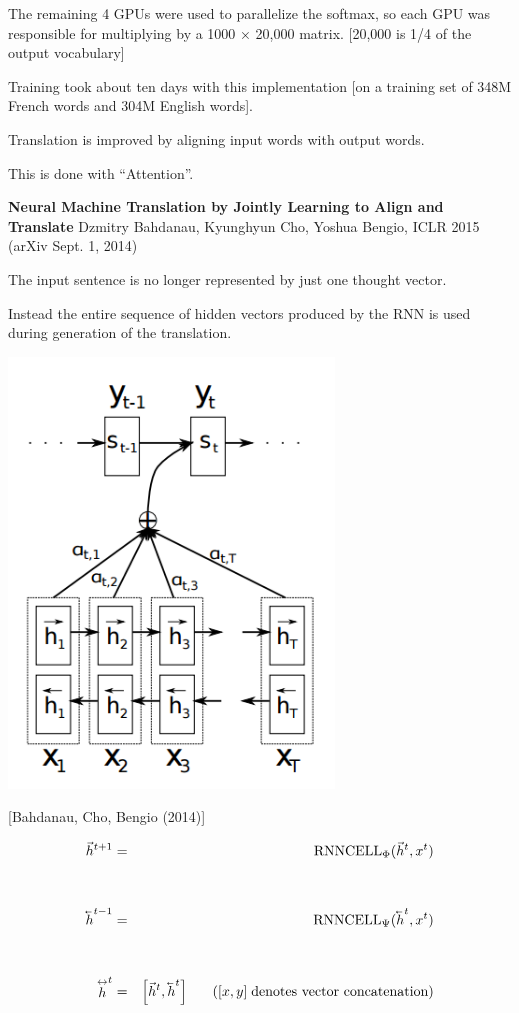 {{\vfill
The remaining 4 GPUs were used to parallelize the softmax, so each GPU was responsible
for multiplying by a 1000 × 20,000 matrix. [20,000 is 1/4 of the output vocabulary]

\vfill
Training took about ten days with this implementation [on a training set of 348M French words and 304M English words].
}


Translation is improved by aligning input words with output words.

\vfill
This is done with ``Attention''.

\vfill
{\bf Neural Machine Translation by Jointly Learning to Align and Translate}
Dzmitry Bahdanau, Kyunghyun Cho, Yoshua Bengio, ICLR 2015 (arXiv Sept. 1, 2014)


The input sentence is no longer represented by just one thought vector.

\vfill
Instead the entire sequence of hidden vectors produced by the RNN is used during generation of the translation.


\centerline{\includegraphics[height=4.5in]{../images/attention}}
\centerline{[Bahdanau, Cho, Bengio (2014)]}


\begin{eqnarray*}
  \vec{h}^{t+1} & =  & \mathrm{RNNCELL}_\Phi(\vec{h}^t,x^t) \\
  \\
  \\
  \cev{h}^{t-1} & =  & \mathrm{RNNCELL}_\Psi(\cev{h}^t,x^t) \\
  \\
  \\
  \dvec{h}^t & = & \left[\vec{h}^t,\cev{h}^t\right]\;\;\;\;\;\;\left([x,y]\;\mbox{denotes vector concatenation}\right)
\end{eqnarray*}

}
